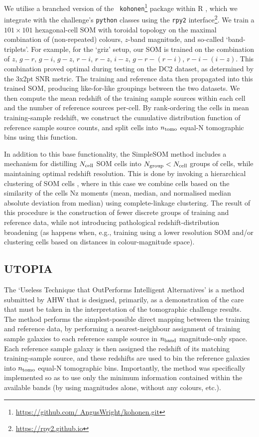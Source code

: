 \documentclass[twocolumn,twocolappendix]{aastex63}
\begin{document}
We utilise a branched version of the {\tt
kohonen}\footnote{\url{https://github.com/ AngusWright/kohonen.git}} package
\citep{Wright/etal:2020b, Wehrens/Kruisselbrink:2018, Wehrens/Lutgarde:2007}
within R \citep{R}, which we integrate with  the challenge's {\tt python}
classes using the {\tt rpy2} interface\footnote{\url{https://rpy2.github.io}}. 
We train a $101 \times 101$ hexagonal-cell SOM with toroidal topology on the
maximal combination of (non-repeated) colours, $z$-band magnitude, and so-called
`band-triplets'. For example, for the `griz' setup, our SOM is trained on the
combination of  $z$, $g-r$, $g-i$, $g-z$, $r-i$, $r-z$, $i-z$, $g-r-(r-i)$,
$r-i-(i-z)$. This combination proved optimal during testing on the DC2 dataset,
as determined by the 3x2pt SNR metric. The training and reference data then
propagated into this trained SOM, producing like-for-like groupings between the
two datasets. We then compute the mean redshift of the training sample sources
within each cell and the number of reference sources per-cell. By rank-ordering
the cells in mean training-sample redshift, we construct the cumulative
distribution function of reference sample source counts, and split cells into
${n_{\rm tomo}}$ equal-N tomographic bins using this function. 

In addition to this base functionality, the SimpleSOM method includes a
mechanism for distilling $N_{\rm cell}$ SOM cells into $N_{\rm group}<N_{\rm
cell}$ groups of cells, while maintaining optimal redshift resolution. This is
done by invoking a hierarchical clustering of SOM cells \citep[see Appendix B of
][]{Wright/etal:2020a}, where in this case we combine cells based on the
similarity of the cells Nz moments (mean, median, and normalised median absolute
deviation from median) using complete-linkage clustering. The result of this
procedure is the construction of fewer discrete groups of training and reference
data, while not introducing pathological redshift-distribution broadening (as
happens when, e.g., training using a lower resolution SOM and/or clustering
cells based on distances in colour-magnitude space). 


\subsection{ {\sc UTOPIA} }

The `Useless Technique that OutPerforms Intelligent Alternatives' is a method
submitted by AHW that is designed,  primarily, as a demonstration of the care
that must be taken in the interpretation of the tomographic challenge results. 
The method performs  the simplest-possible direct mapping between the training
and reference data, by performing a nearest-neighbour  assignment of training
sample galaxies to each reference sample source in $n_{\rm band}$ magnitude-only
space. Each reference  sample galaxy is then assigned the redshift of its
matching training-sample source, and these redshifts are  used to bin the
reference galaxies into $n_{\rm tomo}$ equal-N tomographic bins. Importantly,
the method was specifically  implemented so as to use only the minimum
information contained within the available bands (by using magnitudes alone,
without  any colours, etc.). 
\end{document}
